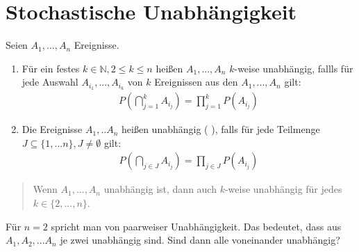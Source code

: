 \section{Stochastische Unabhängigkeit}
\begin{definition}
Seien $A_1, ...  , A_n$ Ereignisse.
\begin{enumerate}
\item Für ein festes $k \in \mathbb N, 2 \leq k \leq n$ heißen $A_1 , ..., A_n$ $k$-weise unabhängig, fallls für jede Auswahl %
$A_{i_1}, ... , A_{i_k}$ von $k$ Ereignissen aus den $A_1 , ... , A_n$ gilt:
\begin{align*}
P \left ( \bigcap\limits_{j=1}^k A_{i_j} \right ) = \prod\limits_{j=1}^k P(A_{i_j})
\end{align*}

\item Die Ereignisse $A_1, .. A_n $ heißen unabhängig (  ), falls für jede Teilmenge $J \subseteq \{1,...n\}, J \neq \emptyset$ gilt:
\begin{align*}
P \left ( \bigcap\limits_{j \in J} A_{i_j} \right ) = \prod\limits_{j \in J} P(A_{i_j})
\end{align*}
\end{enumerate}
\end{definition}
\begin{quote}
Wenn $A_1, ..., A_n$ unabhängig ist, dann auch $k$-weise unabhängig für jedes $k \in \{2, ... , n\}$.
\end{quote}
Für $n=2$ spricht man von paarweiser Unabhängigkeit. Das bedeutet, dass aus $A_1,A_2, ... A_n$ je zwei unabhängig sind. %
Sind dann alle voneinander unabhängig?

